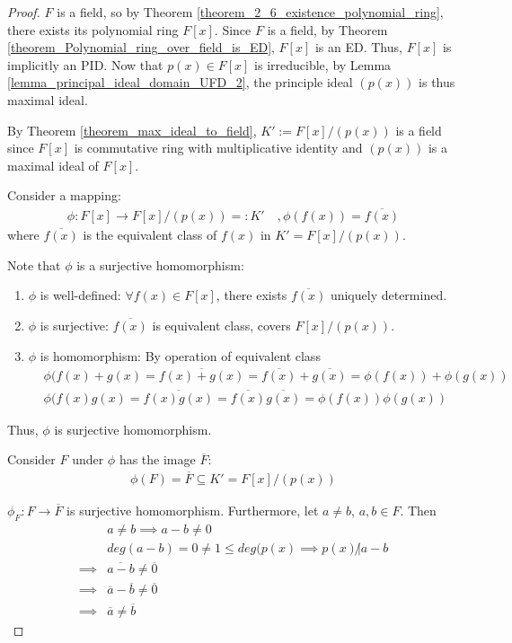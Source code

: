 \documentclass[utf8]{ctexbook}
\begin{document}
\begin{proof}
$F$ is a field, so by Theorem \ref{theorem_2_6_existence_polynomial_ring}, there exists its polynomial ring $F[x]$. Since $F$ is a field, by Theorem \ref{theorem_Polynomial_ring_over_field_is_ED}, $F[x]$ is an ED. Thus, $F[x]$ is implicitly an PID. Now that $p(x) \in F[x]$ is irreducible, by Lemma \ref{lemma_principal_ideal_domain_UFD_2}, the principle ideal $(p(x))$ is thus maximal ideal.

By Theorem \ref{theorem_max_ideal_to_field}, $K' := F[x] / (p(x))$ is a field since $F[x]$ is commutative ring with multiplicative identity and $(p(x))$ is a maximal ideal of $F[x]$.

Consider a mapping:
\begin{align*}
\phi : F[x] \longrightarrow F[x] / (p(x)) =: K' \quad, \phi(f(x)) = \overline{f(x)}
\end{align*}
where $\overline{f(x)}$ is the equivalent class of $f(x)$ in $K'= F[x]/(p(x))$.

Note that $\phi$ is a surjective homomorphism:
\begin{enumerate}
\item{$\phi$ is well-defined: $\forall f(x) \in F[x]$, there exists $\overline{f(x)}$ uniquely determined.}
\item{$\phi$ is surjective: $\overline{f(x)}$ is equivalent class, covers $F[x] / (p(x))$.}
\item{$\phi$ is homomorphism: By operation of equivalent class
\begin{align*}
& \phi(f(x) + g(x) = \overline{f(x) + g(x)} = \overline{f(x)} + \overline{g(x)} = \phi(f(x)) + \phi(g(x)) \\
& \phi(f(x)  g(x) = \overline{f(x)  g(x)} = \overline{f(x)}  \overline{g(x)} = \phi(f(x))  \phi(g(x))
\end{align*}
}
\end{enumerate}

Thus, $\phi$ is surjective homomorphism.

Consider $F$ under $\phi$ has the image $\overline{F}$:
\begin{align*}
\phi(F) = \overline{F} \subseteq K' = F[x]/(p(x))
\end{align*}

$\phi_{F} : F \longrightarrow \overline{F}$ is surjective homomorphism. Furthermore, let $a \neq b$, $a, b \in F$. Then
\begin{align*}
& a \neq b \implies a- b \neq 0 \\
& deg(a-b) = 0 \neq 1 \leq  deg(p(x) \implies p(x) \not | a - b \\
\implies & \overline{a - b } \neq \overline{0} \\
\implies & \overline{a} - \overline{b} \neq \overline{0} \\
\implies & \overline{a} \neq \overline{b}
\end{align*}


\end{proof}
\end{document}
